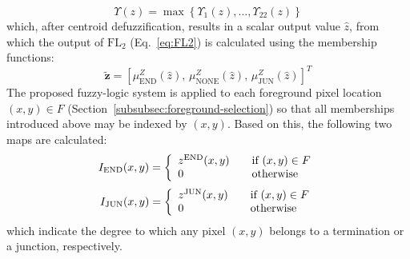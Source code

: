 \begin{equation}
\Upsilon(z) = \max\left\{\Upsilon_{1}(z),\dots,\Upsilon_{22}(z)\right\}
\end{equation}
which, after centroid defuzzification, results in a scalar output value $\hat{z}$, from which the output of $\mathrm{FL}_{2}$ (Eq.~\ref{eq:FL2}) is calculated using the membership functions:
\begin{equation}
\tilde{\mathbf{z}} = \left[\mu_{\textrm{END}}^{Z}(\hat{z}),\, \mu_{\textrm{NONE}}^{Z}(\hat{z}),\, \mu_{\textrm{JUN}}^{Z}(\hat{z})\right]^{T}
\end{equation}
The proposed fuzzy-logic system is applied to each foreground pixel location $(x,y)\in F$ (Section~\ref{subsubsec:foreground-selection}) so that all memberships introduced above may be indexed by $(x,y)$. Based on this, the following two maps are calculated:
\begin{equation}
I_{\textrm{END}}(x,y)=\left\{
\begin{array}{l@{\qquad}l}
z^{\textrm{END}}(x,y) & \textrm{if}\ (x,y)\in F \\
0 & \textrm{otherwise}
\end{array}
\right.
\end{equation}
\begin{equation}
I_{\textrm{JUN}}(x,y)=\left\{
\begin{array}{l@{\qquad}l}
z^{\textrm{JUN}}(x,y) & \textrm{if}\ (x,y)\in F \\
0 & \textrm{otherwise}
\end{array}
\right.
\end{equation}
which indicate the degree to which any pixel $(x,y)$ belongs to a termination or a junction, respectively.

